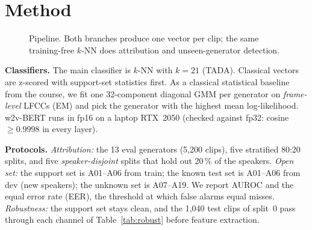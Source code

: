\documentclass[11pt,a4paper]{article}
\begin{document}
\section{Method}
\begin{figure}[h]
\centering
{}
\caption{Pipeline. Both branches produce one vector per clip; the same training-free $k$-NN
does attribution and unseen-generator detection.}
\label{fig:pipe}
\end{figure}

\textbf{Classifiers.} The main classifier is $k$-NN with $k=21$ (TADA). Classical vectors are
z-scored with support-set statistics first. As a classical statistical baseline from the
course, we fit one 32-component diagonal GMM per generator on \emph{frame-level} LFCCs (EM)
and pick the generator with the highest mean log-likelihood. w2v-BERT runs in fp16 on a
laptop RTX~2050 (checked against fp32: cosine $\ge 0.9998$ in every layer).

\textbf{Protocols.} \emph{Attribution:} the 13 eval generators (5{,}200 clips), five
stratified 80:20 splits, and five \emph{speaker-disjoint} splits that hold out 20\,\% of the
speakers. \emph{Open set:} the support set is A01--A06 from train; the known test set is
A01--A06 from dev (new speakers); the unknown set is A07--A19. We report AUROC and the
equal error rate (EER), the threshold at which false alarms equal misses. \emph{Robustness:}
the support set stays clean, and the 1{,}040 test clips of split~0 pass through each channel of
Table~\ref{tab:robust} before feature extraction.
\end{document}

